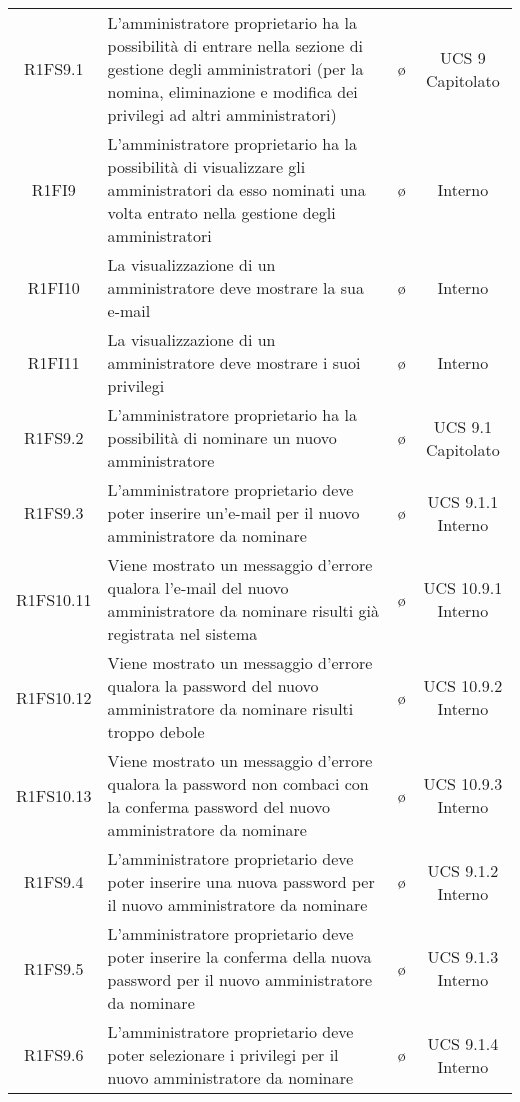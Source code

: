 {\begin{longtable}{ c C{8cm} c c}
R1FS9.1 & L'amministratore proprietario ha la possibilità di entrare nella sezione di gestione degli amministratori (per la nomina, eliminazione e modifica dei privilegi ad altri amministratori) & \o & UCS 9 Capitolato \\

R1FI9 & L'amministratore proprietario ha la possibilità di visualizzare gli amministratori da esso nominati una volta entrato nella gestione degli amministratori & \o & Interno \\

R1FI10 & La visualizzazione di un amministratore deve mostrare la sua e-mail & \o & Interno \\

R1FI11 & La visualizzazione di un amministratore deve mostrare i suoi privilegi & \o & Interno \\

R1FS9.2 & L'amministratore proprietario ha la possibilità di nominare un nuovo amministratore & \o & UCS 9.1 Capitolato\\

R1FS9.3 & L'amministratore proprietario deve poter inserire un'e-mail per il nuovo amministratore da nominare & \o & UCS 9.1.1 Interno\\

R1FS10.11 & Viene mostrato un messaggio d'errore qualora l'e-mail del nuovo amministratore da nominare risulti già registrata nel sistema & \o & UCS 10.9.1 Interno\\

R1FS10.12 & Viene mostrato un messaggio d'errore qualora la password del nuovo amministratore da nominare risulti troppo debole & \o & UCS 10.9.2 Interno\\

R1FS10.13 & Viene mostrato un messaggio d'errore qualora la password non combaci con la conferma password del nuovo amministratore da nominare & \o & UCS 10.9.3 Interno\\

R1FS9.4 & L'amministratore proprietario deve poter inserire una nuova password per il nuovo amministratore da nominare & \o & UCS 9.1.2 Interno\\

R1FS9.5 & L'amministratore proprietario deve poter inserire la conferma della nuova password per il nuovo amministratore da nominare & \o & UCS 9.1.3 Interno\\

R1FS9.6 & L'amministratore proprietario deve poter selezionare i privilegi per il nuovo amministratore da nominare & \o & UCS 9.1.4 Interno\\


\end{longtable}}
